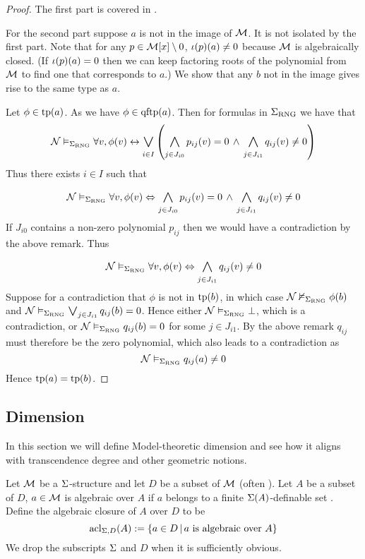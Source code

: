 \begin{proof}
    The first part is covered in 
    .

    For the second part suppose $a$ is not in the image of $\mathcal{M}$.
    It is not isolated by the first part.
    Note that for any $p \in \mathcal{M}[x] \setminus {0}$, 
    $\iota(p)(a) \ne 0$ because $\mathcal{M}$ is algebraically closed. 
    (If $\iota(p)(a) = 0$ then we can keep factoring roots of the polynomial
    from $\mathcal{M}$ to find one that corresponds to $a$.)
    We show that any $b$ not in the image gives rise to the same type as $a$.

    Let $\phi \in \operatorname{tp}(a)$.
    As 
    we have 
    $\phi \in \operatorname{qftp}(a)$.
    Then  
    for formulas in $\Sigma_{\mathrm{RNG}}$ we have that 
    \[ 
        \NN \model{\Si_\RNG} \forall v, \phi(v) 
        \IFF \bigor{i \in I}{} 
        \brkt{\bigand{j \in J_{i0}}{} p_{ij}(v) = 0 \AND 
        \bigand{j \in J_{i1}}{} q_{ij}(v) \ne 0}
    \]
    Thus there exists $i \in I$ such that 
    \[ 
        \NN \model{\Si_\RNG} \forall v, \phi(v) \iff
        \bigand{j \in J_{i0}}{} p_{ij}(v) = 0 \AND 
        \bigand{j \in J_{i1}}{} q_{ij}(v) \ne 0
    \]
    If $J_{i0}$ contains a non-zero polynomial $p_{ij}$ then we would have a 
    contradiction by the above remark.
    Thus 
    \[ 
        \NN \model{\Si_\RNG} \forall v, \phi(v) \iff
        \bigand{j \in J_{i1}}{} q_{ij}(v) \ne 0
    \]
    Suppose for a contradiction
    that $\phi$ is not in $\operatorname{tp}(b)$, 
    in which case $\mathcal{N} \nvDash_{\Sigma_{\mathrm{RNG}}} \phi(b)$
    and $\NN \model{\Si_\RNG} \bigor{j \in J_{i1}}{} q_{ij}(b) = 0$.
    Hence either $\mathcal{N} \vDash_{\Sigma_{\mathrm{RNG}}} \bot$, which is a contradiction,
    or $\mathcal{N} \vDash_{\Sigma_{\mathrm{RNG}}} q_{ij}(b) = 0$ for some $j \in J_{i1}$.
    By the above remark $q_{ij}$ must therefore be the zero polynomial,
    which also leads to a contradiction as 
    \[ 
        \mathcal{N} \vDash_{\Sigma_{\mathrm{RNG}}} q_{ij}(a) \ne 0
    \]
    Hence $\operatorname{tp}(a) = \operatorname{tp}(b)$.
\end{proof}


\subsection{Dimension}
In this section we will define Model-theoretic dimension
and see how it aligns with transcendence degree and other geometric notions.
\begin{dfn}
    Let $\mathcal{M}$ be a $\Sigma$-structure and let $D$ be a subset of $\mathcal{M}$
    (often ).
    Let $A$ be a subset of $D$, 
    $a \in \mathcal{M}$ is algebraic over $A$ if $a$ belongs to a finite 
    $\Sigma(A)$-definable set .
    Define the algebraic closure of $A$ over $D$ to be
    \[\operatorname{acl}_{\Sigma,D}(A) := \left\{a \in D \,|\, a \text{ is algebraic over } A\right\}\]
    We drop the subscripts $\Sigma$ and $D$ when it is sufficiently obvious.
\end{dfn}

